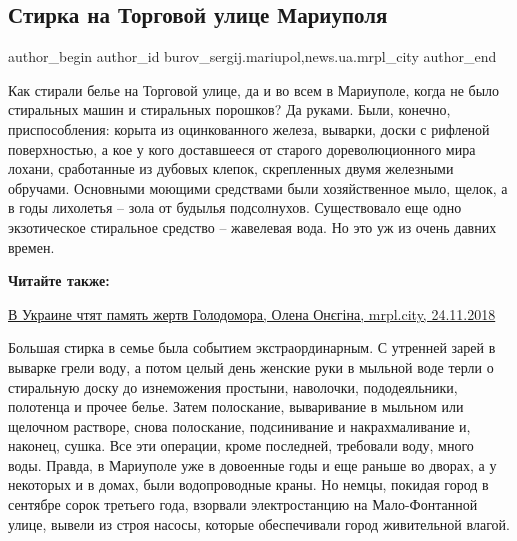  
 
 
 
 
 
\subsection{Стирка на Торговой улице Мариуполя}
\label{sec:24_11_2018.stz.news.ua.mrpl_city.1.stirka_na_torgovoj_ulice_mariupolja}
 
\ifcmt
 author_begin
   author_id burov_sergij.mariupol,news.ua.mrpl_city
 author_end
\fi

Как стирали белье на Торговой улице, да и во всем в Мариуполе, когда не было
стиральных машин и стиральных порошков? Да руками. Были, конечно,
приспособления: корыта из оцинкованного железа, выварки, доски с рифленой
поверхностью, а кое у кого доставшееся от старого дореволюционного мира лохани,
сработанные из дубовых клепок, скрепленных двумя железными обручами. Основными
моющими средствами были хозяйственное мыло, щелок, а в годы лихолетья – зола от
будылья подсолнухов. Существовало еще одно экзотическое стиральное средство –
жавелевая вода. Но это уж из очень давних времен.

\textbf{Читайте также:} 

\href{https://mrpl.city/news/view/v-ukraine-chtyat-pamyat-zhertv-golodomora-video}{%
В Украине чтят память жертв Голодомора, Олена Онєгіна, mrpl.city, 24.11.2018}

 Большая стирка в семье была событием экстраординарным. С утренней зарей в
выварке грели воду, а потом целый день женские руки в мыльной воде терли о
стиральную доску до изнеможения простыни, наволочки, пододеяльники, полотенца и
прочее белье. Затем полоскание, вываривание в мыльном или щелочном растворе,
снова полоскание, подсинивание и накрахмаливание и, наконец, сушка. Все эти
операции, кроме последней, требовали воду, много воды. Правда, в Мариуполе уже
в довоенные годы и еще раньше во дворах, а у некоторых и в домах, были
водопроводные краны. Но немцы, покидая город в сентябре сорок третьего года,
взорвали электростанцию на Мало-Фонтанной улице, вывели из строя насосы,
которые обеспечивали город живительной влагой.

